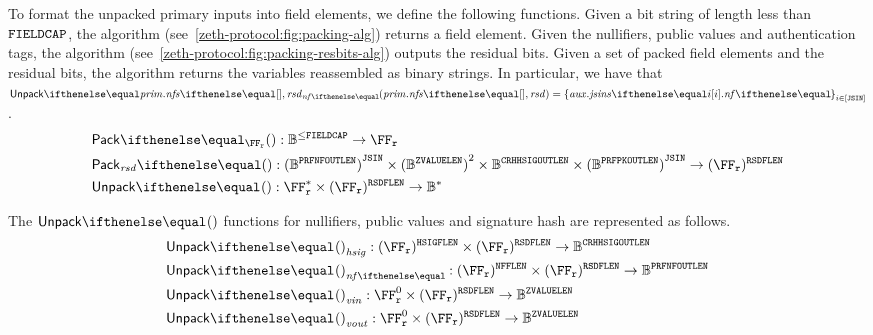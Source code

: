 To format the unpacked primary inputs into field elements, we define the following functions.
Given a bit string of length less than $\mathtt{FIELDCAP}$, the algorithm \pack{}{} (see~\cref{zeth-protocol:fig:packing-alg}) returns a field element. Given the nullifiers, public values and authentication tags, the algorithm \packResBits{}{} (see~\cref{zeth-protocol:fig:packing-resbits-alg}) outputs the residual bits. Given a set of packed field elements and the residual bits, the algorithm \unpack{}{} returns the variables reassembled as binary strings. In particular, we have that $\unpack{\priminputs.\nfs{}, \resbits}{\nf{}} = \indexedset{\auxinputs.\jsins{i}.\nf{}}{i \in [\jsin]}$.
\begin{align*}
    &\pack{}{\FFx{\rCURVE}} : \BB^{\leq \fieldBitCap} \to \FFx{\rCURVE} \\
    &\packResBits{} : {(\BB^\prfNfOutLen)}^{\jsin} \times {(\BB^\zvalueLen)}^2 \times \BB^\crhhsigOutLen \times {(\BB^\prfPkOutLen)}^{\jsin} \to (\FFx{\rCURVE})^\resBitsFLen \\
    &\unpack{}{} : \FFx{\rCURVE}^* \times (\FFx{\rCURVE})^{\resBitsFLen} \to \BB^* \\
\end{align*}

The $\unpack{}{}$ functions for nullifiers, public values and signature hash are represented as follows.
\begin{align*}
    &\unpack{}{}_{\hsig} : (\FFx{\rCURVE})^\hsigFLen \times (\FFx{\rCURVE})^{\resBitsFLen} \to \BB^\crhhsigOutLen \\
    &\unpack{}{}_{\nf{}} : (\FFx{\rCURVE})^\nfFLen \times (\FFx{\rCURVE})^{\resBitsFLen} \to \BB^\prfNfOutLen \\
    &\unpack{}{}_{\vin} : \FFx{\rCURVE}^0 \times (\FFx{\rCURVE})^{\resBitsFLen} \to \BB^\zvalueLen \\
    &\unpack{}{}_{\vout} : \FFx{\rCURVE}^0 \times (\FFx{\rCURVE})^{\resBitsFLen} \to \BB^\zvalueLen
\end{align*}

